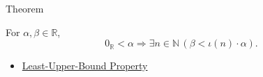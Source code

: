 \begin{theorembox}{Theorem}
\begin{theorem}
\label{thm:archimedean-property-of-r}
For $\alpha,\beta\in\mathbb{R}$,
\[
0_{\mathbb{R}}<\alpha
\Longrightarrow
\exists n\in\mathbb{N}\,(\beta<\iota(n)\cdot\alpha).
\]
\end{theorem}
\end{theorembox}

\begin{dependencies}
\begin{itemize}
  \item \hyperref[thm:lub-property-r]{Least-Upper-Bound Property}
\end{itemize}
\end{dependencies}
